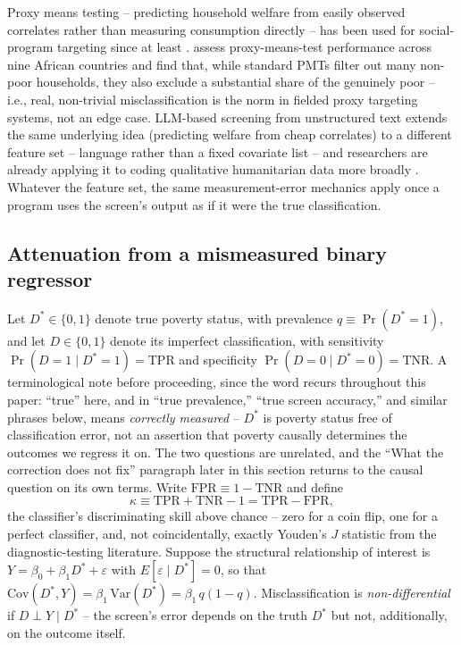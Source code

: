 \documentclass[12pt]{article}
\begin{document}
Proxy means testing -- predicting household welfare from easily observed correlates rather than measuring consumption directly -- has been used for social-program targeting since at least \citet{grosh1995proxy}. \citet{brown2018poor} assess proxy-means-test performance across nine African countries and find that, while standard PMTs filter out many non-poor households, they also exclude a substantial share of the genuinely poor -- i.e., real, non-trivial misclassification is the norm in fielded proxy targeting systems, not an edge case. LLM-based screening from unstructured text extends the same underlying idea (predicting welfare from cheap correlates) to a different feature set -- language rather than a fixed covariate list -- and researchers are already applying it to coding qualitative humanitarian data more broadly \citep{marston2026large}. Whatever the feature set, the same measurement-error mechanics apply once a program uses the screen's output as if it were the true classification.

\subsection{Attenuation from a mismeasured binary regressor}
\label{sec:attenuation}

Let $D^{*} \in \{0,1\}$ denote true poverty status, with prevalence $q \equiv \Pr(D^{*}=1)$, and let $D \in \{0,1\}$ denote its imperfect classification, with sensitivity $\Pr(D=1\mid D^{*}=1) = \text{TPR}$ and specificity $\Pr(D=0\mid D^{*}=0) = \text{TNR}$. A terminological note before proceeding, since the word recurs throughout this paper: ``true'' here, and in ``true prevalence,'' ``true screen accuracy,'' and similar phrases below, means \emph{correctly measured} -- $D^{*}$ is poverty status free of classification error, not an assertion that poverty causally determines the outcomes we regress it on. The two questions are unrelated, and the ``What the correction does not fix'' paragraph later in this section returns to the causal question on its own terms. Write $\text{FPR} \equiv 1-\text{TNR}$ and define
\begin{equation}
\kappa \equiv \text{TPR} + \text{TNR} - 1 = \text{TPR} - \text{FPR},
\label{eq:kappa}
\end{equation}
the classifier's discriminating skill above chance -- zero for a coin flip, one for a perfect classifier, and, not coincidentally, exactly Youden's $J$ statistic from the diagnostic-testing literature. Suppose the structural relationship of interest is $Y = \beta_0 + \beta_1 D^{*} + \varepsilon$ with $E[\varepsilon \mid D^{*}]=0$, so that $\mathrm{Cov}(D^{*},Y) = \beta_1\,\mathrm{Var}(D^{*}) = \beta_1\, q(1-q)$. Misclassification is \emph{non-differential} if $D \perp Y \mid D^{*}$ -- the screen's error depends on the truth $D^{*}$ but not, additionally, on the outcome itself.
\end{document}
